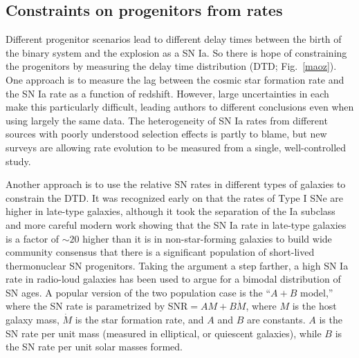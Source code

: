 \documentclass{nature1}
\begin{document}
\subsection{Constraints on progenitors from rates}
Different progenitor scenarios lead to different delay times between
the birth of the binary system and the explosion as a SN
Ia\citep{2005A&A...441.1055G}.  So there is hope of constraining the
progenitors by measuring the delay time distribution (DTD;
Fig.~\ref{maoz}).  One approach is to measure the lag between the
cosmic star formation rate and the SN Ia rate as a function of
redshift.  However, large uncertainties in each make this particularly
difficult, leading authors to different conclusions even
when using largely the same
data\citep{2010ApJ...713...32S,2008ApJ...673..981K}.  The
heterogeneity of SN Ia rates from different sources with poorly
understood selection effects is partly to blame, but new
surveys are allowing rate evolution to be measured
from a single, well-controlled study\citep{2010ApJ...713.1026D}.

Another approach is to use the relative SN rates in different types of
galaxies to constrain the DTD.  It was recognized early on that the
rates of Type I SNe are higher in late-type
galaxies\citep{1979AJ.....84..985O}, although it took the separation
of the Ia subclass and more careful modern work showing that the SN Ia
rate in late-type galaxies is a factor of $\sim 20$ higher than it is
in non-star-forming galaxies to build wide community consensus that
there is a significant population of short-lived thermonuclear SN
progenitors\citep{2005A&A...433..807M}.  Taking the argument a step
farther, a high SN Ia rate in radio-loud galaxies has been used to
argue for a bimodal distribution of SN
ages\citep{2006MNRAS.370..773M}.  A popular version of the two
population case is the ``$A+B$ model\citep{2005ApJ...629L..85S},'' where
the SN rate is parametrized by SNR$ = A M + B \dot{M}$, where $M$ is
the host galaxy mass, $\dot{M}$ is the star formation rate, and $A$
and $B$ are constants.  $A$ is the SN rate per unit mass (measured in
elliptical, or quiescent galaxies), while $B$ is the SN rate per unit
solar masses formed.
\end{document}
